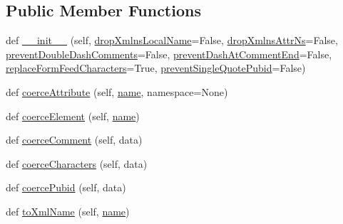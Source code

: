 \subsection*{Public Member Functions}
\begin{DoxyCompactItemize}
\item 
def \hyperlink{classpip_1_1__vendor_1_1html5lib_1_1__ihatexml_1_1InfosetFilter_a45453d01b1770ac9d6222f09797d4e24}{\+\_\+\+\_\+init\+\_\+\+\_\+} (self, \hyperlink{classpip_1_1__vendor_1_1html5lib_1_1__ihatexml_1_1InfosetFilter_a8fcd839f3918332c9f3de8a8cf4b496d}{drop\+Xmlns\+Local\+Name}=False, \hyperlink{classpip_1_1__vendor_1_1html5lib_1_1__ihatexml_1_1InfosetFilter_a5b0f61648e4bbbd5bf8e56ae20395d68}{drop\+Xmlns\+Attr\+Ns}=False, \hyperlink{classpip_1_1__vendor_1_1html5lib_1_1__ihatexml_1_1InfosetFilter_a825e2cfec9d3553f0be638c083fab3e5}{prevent\+Double\+Dash\+Comments}=False, \hyperlink{classpip_1_1__vendor_1_1html5lib_1_1__ihatexml_1_1InfosetFilter_ac12c22b2e2eda7d27019bc5c8c31a4de}{prevent\+Dash\+At\+Comment\+End}=False, \hyperlink{classpip_1_1__vendor_1_1html5lib_1_1__ihatexml_1_1InfosetFilter_aa04c732db7c5f6af11173091a971bd5e}{replace\+Form\+Feed\+Characters}=True, \hyperlink{classpip_1_1__vendor_1_1html5lib_1_1__ihatexml_1_1InfosetFilter_a3f37c1797f7b71a12313580a21fab317}{prevent\+Single\+Quote\+Pubid}=False)
\item 
def \hyperlink{classpip_1_1__vendor_1_1html5lib_1_1__ihatexml_1_1InfosetFilter_aa43b5379491cd6d62659b3aea57413bc}{coerce\+Attribute} (self, \hyperlink{namespacepip_1_1__vendor_1_1html5lib_1_1__ihatexml_a23d70a7532508a399a209dff52ab42b3}{name}, namespace=None)
\item 
def \hyperlink{classpip_1_1__vendor_1_1html5lib_1_1__ihatexml_1_1InfosetFilter_a7755a0c4f669f6d0c78226ff2196d40b}{coerce\+Element} (self, \hyperlink{namespacepip_1_1__vendor_1_1html5lib_1_1__ihatexml_a23d70a7532508a399a209dff52ab42b3}{name})
\item 
def \hyperlink{classpip_1_1__vendor_1_1html5lib_1_1__ihatexml_1_1InfosetFilter_ad20d4ed57de139e628160cdf4a8c530e}{coerce\+Comment} (self, data)
\item 
def \hyperlink{classpip_1_1__vendor_1_1html5lib_1_1__ihatexml_1_1InfosetFilter_a81bd381530e5d7ad9a4217e53275de8b}{coerce\+Characters} (self, data)
\item 
def \hyperlink{classpip_1_1__vendor_1_1html5lib_1_1__ihatexml_1_1InfosetFilter_a2c9de9f030c3d198e6ee3dee159e30ad}{coerce\+Pubid} (self, data)
\item 
def \hyperlink{classpip_1_1__vendor_1_1html5lib_1_1__ihatexml_1_1InfosetFilter_ac9f01281313e284c360dee38b6ec368b}{to\+Xml\+Name} (self, \hyperlink{namespacepip_1_1__vendor_1_1html5lib_1_1__ihatexml_a23d70a7532508a399a209dff52ab42b3}{name})

\end{DoxyCompactItemize}
